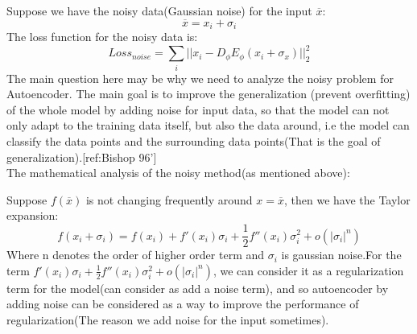 \documentclass{article}
\begin{document}
\noindent
Suppose we have the noisy data(Gaussian noise) for the input $\overline{x}$:
\[
\overline{x} = x_i + \sigma_i
\]
The loss function for the noisy data is:
\[
Loss_{noise} = \sum_i||x_i - D_{\phi}E_{\phi}(x_i + \sigma_x)||^2_2
\]
The main question here may be why we need to analyze the noisy problem for Autoencoder. The main goal is to improve the generalization (prevent overfitting) of the whole model by adding noise for input data, so that the model can not only adapt to the training data itself, but also the data around, i.e the model can classify the data points and the surrounding data points(That is the goal of generalization).[ref:Bishop 96']\\

\noindent
The mathematical analysis of the noisy method(as mentioned above):

\noindent
Suppose $f(\overline{x})$ is not changing frequently around $x=\overline{x}$, then we have the Taylor expansion:
\[
f(x_i + \sigma_i) = f(x_i) + f'(x_i)\sigma_i + \frac{1}{2}f''(x_i)\sigma_i^2 + o(|\sigma_i|^n)
\]
Where n denotes the order of higher order term and $\sigma_i$ is gaussian noise.For the term $ f'(x_i)\sigma_i + \frac{1}{2}f''(x_i)\sigma_i^2 + o(|\sigma_i|^n)$, we can consider it as a regularization term for the model(can consider as add a noise term), and so autoencoder by adding noise can be considered as a way to improve the performance of regularization(The reason we add noise for the input sometimes).
\end{document}
